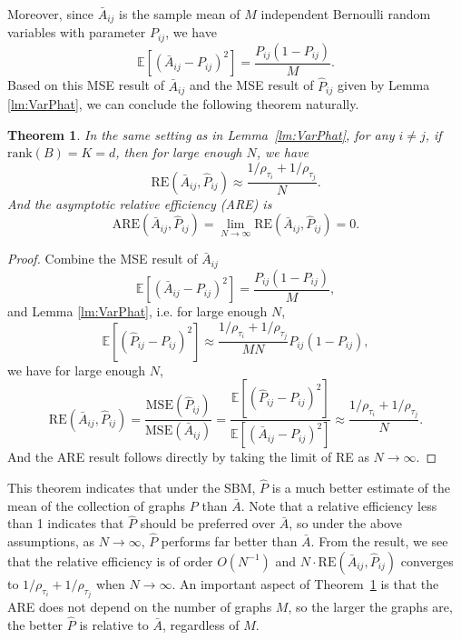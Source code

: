 \documentclass[10pt,letterpaper]{article}
\newtheorem{theorem}[fact]{Theorem}
\newcommand{\Ex}{\mathbb{E}}
\renewcommand{\hat}{\widehat}
\begin{document}
Moreover, since $\bar{A}_{ij}$ is the sample mean of $M$ independent Bernoulli random variables with parameter $P_{ij}$, we have
\[
    \Ex[(\bar{A}_{ij} - P_{ij})^2] = \frac{P_{ij}(1-P_{ij})}{M}.
\]
Based on this MSE result of $\bar{A}_{ij}$ and the MSE result of $\hat{P}_{ij}$ given by Lemma \ref{lm:VarPhat}, we can conclude the following theorem naturally.
\begin{theorem}
\label{thm:ARE}
In the same setting as in Lemma~\ref{lm:VarPhat}, for any $i \ne j$, if $\mathrm{rank}(B)=K=d$, then for large enough $N$, we have
\begin{equation}
	    \mathrm{RE}(\bar{A}_{ij}, \hat{P}_{ij}) \approx
    \frac{1/\rho_{\tau_i} + 1/\rho_{\tau_j}}{N}.
\label{eq:approx_re}
\end{equation}
And the asymptotic relative efficiency (ARE) is 
\[
    \mathrm{ARE}(\bar{A}_{ij}, \hat{P}_{ij}) = \lim_{N \to \infty} \mathrm{RE}(\bar{A}_{ij}, \hat{P}_{ij}) = 0.
    \label{eq:sbm_are}
\]
\end{theorem}
\begin{proof}
Combine the MSE result of $\bar{A}_{ij}$
\[
    \Ex[(\bar{A}_{ij} - P_{ij})^2] = \frac{P_{ij}(1-P_{ij})}{M},
\]
and Lemma \ref{lm:VarPhat}, i.e. for large enough $N$,
\[
    \Ex[(\hat{P}_{ij} - P_{ij})^2] \approx
    \frac{1/\rho_{\tau_i} + 1/\rho_{\tau_j}}{M N} P_{ij}(1-P_{ij}),
\]
we have for large enough $N$,
\[
	    \mathrm{RE}(\bar{A}_{ij}, \hat{P}_{ij}) = \frac{\mathrm{MSE}(\hat{P}_{ij})}{\mathrm{MSE}(\bar{A}_{ij})}
	    = \frac{\Ex[(\hat{P}_{ij} - P_{ij})^2]}{\Ex[(\bar{A}_{ij} - P_{ij})^2]}
	    \approx \frac{1/\rho_{\tau_i} + 1/\rho_{\tau_j}}{N}.
\]
And the ARE result follows directly by taking the limit of RE as $N\to \infty$.
\end{proof}

This theorem indicates that under the SBM, $\hat{P}$ is a much better estimate of the mean of the collection of graphs $P$ than $\bar{A}$.
Note that a relative efficiency less than 1 indicates that $\hat{P}$ should be preferred over $\bar{A}$, so under the above assumptions, as $N\to\infty$, $\hat{P}$ performs far better than $\bar{A}$.
From the result, we see that the relative efficiency is of order $O(N^{-1})$ and $N \cdot \mathrm{RE}(\bar{A}_{ij}, \hat{P}_{ij})$ converges to $1/\rho_{\tau_i}+1/\rho_{\tau_j}$ when $N\to\infty$.
An important aspect of Theorem~\ref{thm:ARE} is that the ARE does not depend on the number of graphs $M$, so the larger the graphs are, the better $\hat{P}$ is relative to $\bar{A}$, regardless of $M$.
\end{document}
